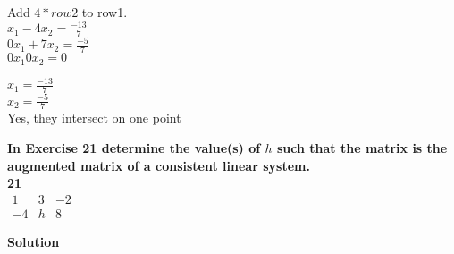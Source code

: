 \documentclass{article}
\begin{document}
Add $4*row2$ to row1.\\
$x_{1} - 4x_{2} = \frac{-13}{7}$\\
$0x_{1} + 7x_{2} = \frac{-5}{7}$\\
$0x_{1} 0x_{2} = 0$

$x_{1} = \frac{-13}{7}$\\
$x_{2} = \frac{-5}{7}$
\\Yes, they intersect on one point
\clearpage

\textbf{In Exercise 21 determine the value(s) of $h$ such that the matrix is the augmented matrix of a consistent linear system.}\\

\textbf{21}\\
$
\begin{matrix}
1 & 3 & -2\\
-4 & h & 8
\end{matrix}
$

\textbf{Solution}\\

    
\end{document}
